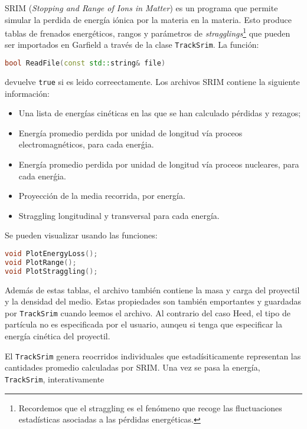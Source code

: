 SRIM (\textit{Stopping and Range of Ions in Matter}) es un programa que permite simular la perdida de energía iónica por la materia en la materia. Esto produce tablas de frenados energéticos, rangos y parámetros de \textit{stragglings}\footnote{Recordemos que el straggling es el fenómeno que recoge las fluctuaciones estadísticas asociadas a las pérdidas energéticas.} que pueden ser importados en Garfield a través de la clase \texttt{TrackSrim}. La función: \\

\begin{lstlisting}[language=C++,style=c++]
bool ReadFile(const std::string& file)
\end{lstlisting}
\vspace*{0.6em}
devuelve \texttt{true} si es leido correectamente. Los archivos SRIM contiene la siguiente información: 

\begin{itemize}
    \item Una lista de energías cinéticas en las que se han calculado pérdidas y rezagos;
    \item Energía promedio perdida por unidad de longitud vía proceos electromagnéticos, para cada enerǵia. 
    \item Energía promedio perdida por unidad de longitud vía proceos nucleares, para cada enerǵia. 
    \item Proyección de la media recorrida, por energía.
    \item Straggling longitudinal y transversal para cada energía. 
\end{itemize}
Se pueden visualizar usando las funciones: \\

\begin{lstlisting}[language=C++,style=c++]
void PlotEnergyLoss();
void PlotRange();
void PlotStraggling(); 
\end{lstlisting}
\vspace*{0.6em}

Además de estas tablas, el archivo también contiene la masa y carga del proyectil y la densidad del medio. Estas propiedades son también emportantes y guardadas por \texttt{TrackSrim} cuando leemos el archivo. Al contrario del caso Heed, el tipo de partícula no es especificada por el usuario, aunqeu si tenga que especificar la energía cinética del proyectil.

El \texttt{TrackSrim} genera reocrridos individuales que estadísiticamente representan las cantidades promedio calculadas por SRIM. Una vez se pasa la energía, \texttt{TrackSrim}, interativamente


